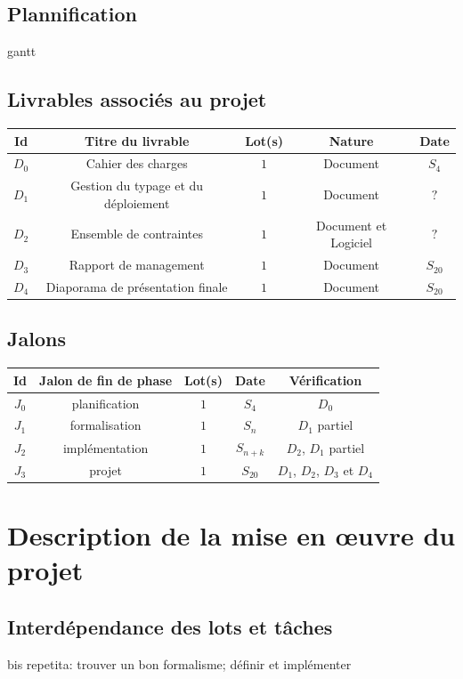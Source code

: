 \documentclass[a4paper]{article}
\begin{document}
\subsection{Plannification}
gantt
\subsection{Livrables associés au projet}
\begin{table}
\centering
\begin{tabular}{c|c|c|c|c}
	Id & Titre du livrable & Lot(s) & Nature & Date \\
	\hline
	\hline
	$D_0$ & Cahier des charges & $1$ & Document & $S_4$ \\
	\hline
	$D_1$ & Gestion du typage et du déploiement & $1$ & Document & $?$ \\
	\hline
	$D_2$ & Ensemble de contraintes & $1$ & Document et Logiciel & $?$ \\
	\hline
	$D_3$ & Rapport de management & $1$ & Document & $S_{20}$ \\
	\hline
	$D_4$ & Diaporama de présentation finale & $1$ & Document & $S_{20}$ \\
\end{tabular}
\end{table}

\subsection{Jalons}
\begin{table}
\centering
\begin{tabular}{c|c|c|c|c}
	Id & Jalon de fin de phase & Lot(s) & Date & Vérification \\
	\hline
	\hline
	$J_0$ & planification & $1$ & $S_4$ & $D_0$ \\
	\hline
	$J_1$ & formalisation & $1$ & $S_n$ & $D_1$ partiel \\
	\hline
	$J_2$ & implémentation & $1$ & $S_{n+k}$ & $D_2$, $D_1$ partiel \\
	\hline
	$J_3$ & projet & $1$ & $S_{20}$ & $D_1$, $D_2$, $D_3$ et $D_4$ \\
\end{tabular}
\end{table}

\section{Description de la mise en œuvre du projet}
\subsection{Interdépendance des lots et tâches}
bis repetita: trouver un bon formalisme; définir et implémenter
\end{document}
